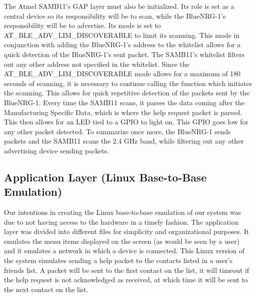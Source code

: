 \documentclass[journal]{IEEEtran}
\begin{document}
The Atmel SAMB11’s GAP layer must also be initialized.  Its role is set as a central device so its responsibility will be to scan, while the BlueNRG-1’s responsibility will be to advertise.  Its mode is set to AT\_BLE\_ADV\_LIM\_DISCOVERABLE to limit its scanning.  This mode in conjunction with adding the BlueNRG-1’s address to the whitelist allows for a quick detection of the BlueNRG-1’s sent packet.  The SAMB11’s whitelist filters out any other address not specified in the whitelist.  Since the AT\_BLE\_ADV\_LIM\_DISCOVERABLE mode allows for a maximum of 180 seconds of scanning, it is necessary to continue calling the function which initiates the scanning.  This allows for quick repetitive detection of the packets sent by the BlueNRG-1.  Every time the SAMB11 scans, it parses the data coming after the Manufacturing Specific Data, which is where the help request packet is parsed.  This then allows for an LED tied to a GPIO to light on.  This GPIO goes low for any other packet detected.  To summarize once more, the BlueNRG-1 sends packets and the SAMB11 scans the 2.4 GHz band, while filtering out any other advertising device sending packets.

\subsection{Application Layer (Linux Base-to-Base Emulation)}
Our intentions in creating the Linux base-to-base emulation of our system was due to not having access to the hardware in a timely fashion.  The application layer was divided into different files for simplicity and organizational purposes.  It emulates the menu items displayed on the screen (as would be seen by a user) and it emulates a network in which a device is connected.  This Linux version of the system simulates sending a help packet to the contacts listed in a user’s friends list.  A packet will be sent to the first contact on the list, it will timeout if the help request is not acknowledged as received, at which time it will be sent to the next contact on the list.

%
%
\end{document}
